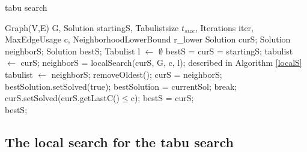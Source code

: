 \documentclass [12pt]{article}
\begin{document}
\begin {algorithm} [H]
\caption {tabu search}
\label {tabusa}
\begin {algorithmic} [3]
\Require Graph(V,E) G, Solution startingS, Tabulistsize $t_{size}$, Iterations iter, MaxEdgeUsage c, NeighborhoodLowerBound r\_lower
\State Solution curS;
\State Solution neighborS;
\State Solution bestS;
\State Tabulist l $\gets$ $\emptyset$
\State bestS = curS = startingS;
\State tabulist $\gets$ curS;
  \State  neighborS = localSearch(curS, G, c, l); \Comment described in Algorithm \ref{localS}
  \State  tabulist $\gets$ neighborS;
    \State removeOldest();
  \EndIf
  \State  curS = neighborS;
    \State bestSolution.setSolved(true);
    \State bestSolution = currentSol;
      \State break; 
    \EndIf
  \EndIf  
    \State curS.setSolved(curS.getLastC()$\leq$c);
    \State bestS = curS;
   \EndIf 
\EndFor\\
\Return bestS;
\end {algorithmic}
\end {algorithm}
\subsection{The local search for the tabu search}
\end{document}
